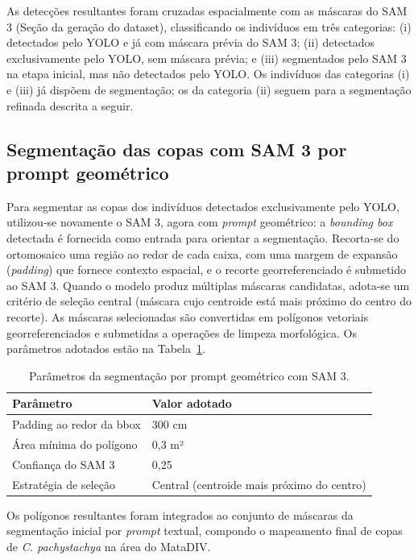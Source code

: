 \documentclass[12pt, a4paper]{article}
\begin{document}
As detecções resultantes foram cruzadas espacialmente com as máscaras do SAM 3
(Seção da geração do dataset), classificando os indivíduos em três categorias:
(i) detectados pelo YOLO e já com máscara prévia do SAM 3; (ii) detectados
exclusivamente pelo YOLO, sem máscara prévia; e (iii) segmentados pelo SAM 3 na
etapa inicial, mas não detectados pelo YOLO. Os indivíduos das categorias (i) e
(iii) já dispõem de segmentação; os da categoria (ii) seguem para a segmentação
refinada descrita a seguir.

\subsection{Segmentação das copas com SAM 3 por prompt geométrico}

Para segmentar as copas dos indivíduos detectados exclusivamente pelo YOLO,
utilizou-se novamente o SAM 3, agora com \textit{prompt} geométrico: a
\textit{bounding box} detectada é fornecida como entrada para orientar a
segmentação. Recorta-se do ortomosaico uma região ao redor de cada caixa, com uma
margem de expansão (\textit{padding}) que fornece contexto espacial, e o recorte
georreferenciado é submetido ao SAM 3. Quando o modelo produz múltiplas máscaras
candidatas, adota-se um critério de seleção central (máscara cujo centroide está
mais próximo do centro do recorte). As máscaras selecionadas são convertidas em
polígonos vetoriais georreferenciados e submetidas a operações de limpeza
morfológica. Os parâmetros adotados estão na Tabela~\ref{tab:seg-params}.

\begin{table}[H]
\centering
\caption{Parâmetros da segmentação por prompt geométrico com SAM 3.}
\label{tab:seg-params}
\begin{tabular}{ll}
\toprule
\textbf{Parâmetro} & \textbf{Valor adotado} \\
\midrule
Padding ao redor da bbox & 300 cm \\
Área mínima do polígono  & 0,3 m² \\
Confiança do SAM 3       & 0,25 \\
Estratégia de seleção    & Central (centroide mais próximo do centro) \\
\bottomrule
\end{tabular}
\end{table}

Os polígonos resultantes foram integrados ao conjunto de máscaras da segmentação
inicial por \textit{prompt} textual, compondo o mapeamento final de copas de
\textit{C. pachystachya} na área do MataDIV.
\end{document}

